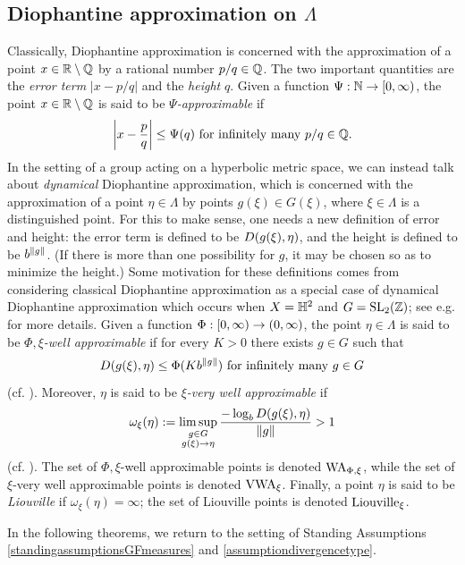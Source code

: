 \subsection{Diophantine approximation on $\Lambda$}
\label{subsubsectiondiophantineapproximation}
Classically, Diophantine approximation is concerned with the approximation of a point $x\in\R\butnot\Q$ by a rational number $p/q\in\Q$. The two important quantities are the \emph{error term} $|x - p/q|$ and the \emph{height} $q$. Given a function $\Psi:\N\to\Rplus$, the point $x\in\R\butnot\Q$ is said to be \emph{$\Psi$-approximable} if
\[
\left|x - \frac pq\right| \leq \Psi(q) \text{ for infinitely many $p/q\in\Q$}.
\]
In the setting of a group acting on a hyperbolic metric space, we can instead talk about \emph{dynamical} Diophantine approximation, which is concerned with the approximation of a point $\eta\in\Lambda$ by points $g(\xi)\in G(\xi)$, where $\xi\in\Lambda$ is a distinguished point. For this to make sense, one needs a new definition of error and height: the error term is defined to be $D(g(\xi),\eta)$, and the height is defined to be $b^{\|g\|}$. (If there is more than one possibility for $g$, it may be chosen so as to minimize the height.) Some motivation for these definitions comes from considering classical Diophantine approximation as a special case of dynamical Diophantine approximation which occurs when $X = \H^2$ and $G = \SL_2(\Z)$; see e.g. \cite[Observation 1.15]{FSU4} for more details. Given a function $\Phi:{[0,\infty)}\to (0,\infty)$, the point $\eta\in\Lambda$ is said to be \emph{$\Phi,\xi$-well approximable} if for every $K > 0$ there exists $g\in G$ such that
\[
D(g(\xi),\eta) \leq \Phi(K b^{\|g\|}) \textup{ for infinitely many $g\in G$}
\]
(cf. \cite[Definition 1.36]{FSU4}). Moreover, $\eta$ is said to be \emph{$\xi$-very well approximable} if
\[
\omega_\xi(\eta) := \limsup_{\substack{g\in G \\ g(\xi)\to\eta}} \frac{-\log_b D(g(\xi),\eta)}{\|g\|} > 1
\]
(cf. \cite[p.9]{FSU4}). The set of $\Phi,\xi$-well approximable points is denoted $\mathrm{WA}_{\Phi,\xi}$, while the set of $\xi$-very well approximable points is denoted $\mathrm{VWA}_\xi$. Finally, a point $\eta$ is said to be \emph{Liouville} if $\omega_\xi(\eta) = \infty$; the set of Liouville points is denoted $\mathrm{Liouville}_\xi$.

In the following theorems, we return to the setting of Standing Assumptions \ref{standingassumptionsGFmeasures} and \ref{assumptiondivergencetype}.

